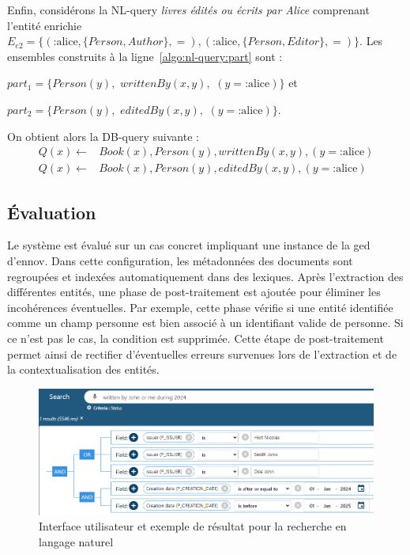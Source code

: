 Enfin, considérons la NL-query \textit{livres édités ou écrits par Alice} comprenant l'entité enrichie $E_{e2} = \{(\text{:alice}, \{Person, Author\}, =), (\text{:alice}, \{Person, Editor\}, =)\}$.
Les ensembles construits à la ligne~\ref{algo:nl-query:part} sont :
\begin{enumerate*}[label=(\roman*)]
    \item $part_1 = \{ Person(y),$ $writtenBy(x, y),$ $(y = \text{:alice}) \}$ et
    \item $part_2 = \{ Person(y),$ $editedBy(x, y),$ $(y = \text{:alice}) \}$.
\end{enumerate*}
On obtient alors la DB-query suivante :
\begin{equation*}
    \begin{split}
        Q(x) \leftarrow & Book(x), Person(y), writtenBy(x, y), (y = \text{:alice}) \\
        Q(x) \leftarrow & Book(x), Person(y), editedBy(x, y), (y = \text{:alice})
    \end{split}
\end{equation*}

\subsection{Évaluation}
Le système est évalué sur un cas concret impliquant une instance de la \gls{ged} d'\gls{ennov}.
Dans cette configuration, les métadonnées des documents sont regroupées et indexées automatiquement dans des lexiques.
Après l'extraction des différentes entités, une phase de post-traitement est ajoutée pour éliminer les incohérences éventuelles.
Par exemple, cette phase vérifie si une entité identifiée comme un champ personne est bien associé à un identifiant valide de personne.
Si ce n'est pas le cas, la condition est supprimée.
Cette étape de post-traitement permet ainsi de rectifier d'éventuelles erreurs survenues lors de l'extraction et de la contextualisation des entités.

\begin{figure}[htb]
    \centering
    \includegraphics[width=\textwidth]{these/part_2/chapter_2/imgs/ui-nlsearch-compress.png}
    \caption[Interface utilisateur pour la recherche en langage naturel]{Interface utilisateur et exemple de résultat pour la recherche en langage naturel}
    \label{fig:nl-query:ui}
\end{figure}


